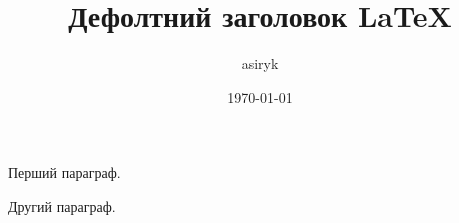 \documentclass[a4paper,12pt]{article}
\author{asiryk}
\title{Дефолтний заголовок \LaTeX}
\date{\today}
\begin{document}
\maketitle

Перший параграф.

Другий параграф.
\end{document}
